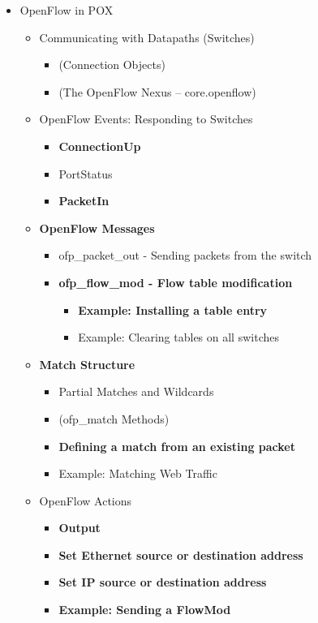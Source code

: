 \documentclass[a4paper]{article}
\begin{document}
\begin{itemize}
\item OpenFlow in POX
\begin{itemize}
\item    Communicating with Datapaths (Switches)
\begin{itemize}
\item        (Connection Objects)
\item        (The OpenFlow Nexus – core.openflow) 
\end{itemize}
\item    OpenFlow Events: Responding to Switches
\begin{itemize}
\item        \textbf{ConnectionUp}
\item        PortStatus
\item         \textbf{PacketIn}
\end{itemize}
\item     \textbf{OpenFlow Messages}
\begin{itemize}
\item        ofp\_packet\_out - Sending packets from the switch
\item         \textbf{ofp\_flow\_mod - Flow table modification}
\begin{itemize}
\item             \textbf{Example: Installing a table entry}
\item            Example: Clearing tables on all switches 
\end{itemize}
\end{itemize}
\item     \textbf{Match Structure}
\begin{itemize}
\item        Partial Matches and Wildcards
\item        (ofp\_match Methods)
\item         \textbf{Defining a match from an existing packet}
\item        Example: Matching Web Traffic 
\end{itemize}
\item    OpenFlow Actions
\begin{itemize}
\item         \textbf{Output}
\item         \textbf{Set Ethernet source or destination address}
\item         \textbf{Set IP source or destination address}
\item         \textbf{Example: Sending a FlowMod}
\end{itemize}
\end{itemize}
\end{itemize}
\end{document}
